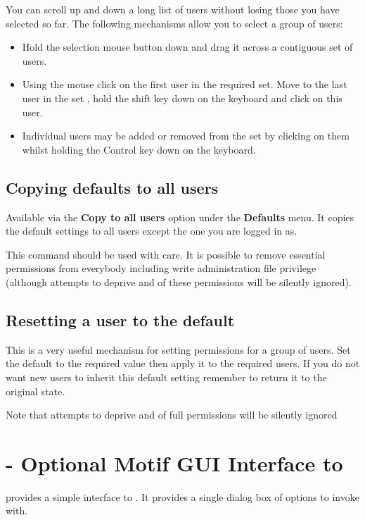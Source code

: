 You can scroll up and down a long list of users without losing those you have selected so far. The following mechanisms allow you to select a
group of users:

\begin{itemize}
\item Hold the selection mouse button down and drag it across a contiguous set of users.
\item Using the mouse click on the first user in the required set. Move to the last user in the set , hold the shift key down on the keyboard
and click on this user.
\item Individual users may be added or removed from the set by clicking on them whilst holding the Control key down on the keyboard.
\end{itemize}
\subsection{Copying defaults to all users}
Available via the \textbf{Copy to all users} option under the \textbf{Defaults} menu. It copies the default settings to all users
except the one you are logged in as.

This command should be used with care. It is possible to remove essential permissions from everybody including write administration
file privilege (although attempts to deprive  and \batchuser{} of these permissions will be silently ignored).

\subsection{Resetting a user to the default}
This is a very useful mechanism for setting permissions for a group of users. Set the default to the required value then apply it to the
required users. If you do not want new users to inherit this default setting remember to return it to the original state.

Note that attempts to deprive  and \batchuser{} of full permissions will be silently ignored

\section{\XmfilemonName{} - Optional Motif GUI Interface to \BtfilemonName}
\PrXmfilemon{} provides a simple interface to \PrBtfilemon. It provides a single dialog box of options to invoke \PrBtfilemon{} with.

